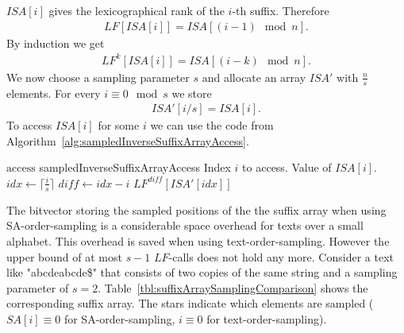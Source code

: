 \begin{Proof}
  $ISA[i]$ gives the lexicographical rank of the $i$-th suffix. Therefore
  \begin{align}
    LF[ISA[i]] = ISA[(i-1) \mod n]
    \text{.}
  \end{align}
  By induction we get
  \begin{align}
    LF^k[ISA[i]] = ISA[(i - k) \mod n]
    \text{.}
  \end{align}
  We now choose a sampling parameter $s$ and allocate an array $ISA'$ with $\frac{n}{s}$ elements. For every $i \equiv 0 \mod s$ we store
  \begin{align}
    ISA'[i/s] = ISA[i]
    \text{.}
  \end{align}
  To access $ISA[i]$ for some $i$ we can use the code from Algorithm~\ref{alg:sampledInverseSuffixArrayAccess}.
  \begin{pseudocode}
    {$\mathrm{access}$}
    {sampledInverseSuffixArrayAccess}
    {Index $i$ to access.}
    {Value of $ISA[i]$.}
    \STATE $idx \gets \lceil \frac{i}{s} \rceil$
    \STATE $diff \gets idx - i$
    \RETURN $LF^{diff}[ISA'[idx]]$
  \end{pseudocode}
\end{Proof}

The bitvector storing the sampled positions of the the suffix array when using SA-order-sampling is a considerable space overhead for texts over a small alphabet. This overhead is saved when using text-order-sampling. However the upper bound of at most $s-1$ $LF$-calls does not hold any more. Consider a text like "abcdeabcde\$" that consists of two copies of the same string and a sampling parameter of $s=2$. Table~\ref{tbl:suffixArraySamplingComparison} shows the corresponding suffix array. The stars indicate which elements are sampled ($SA[i] \equiv 0$ for SA-order-sampling, $i \equiv 0$ for text-order-sampling).

